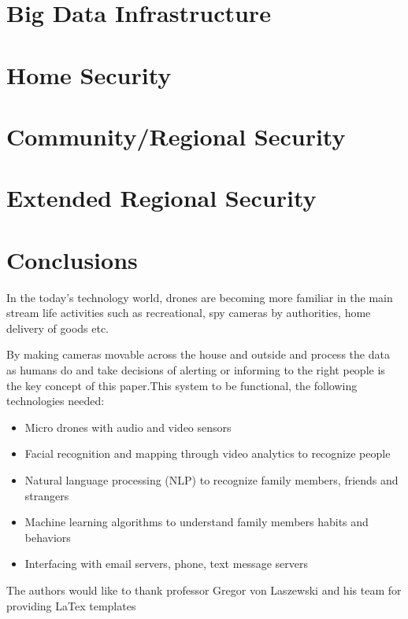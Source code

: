 \documentclass[sigconf]{acmart}
\begin{document}
\section{Big Data Infrastructure}

\section{Home Security}

\section{Community/Regional Security}

\section{Extended Regional Security}

\section{Conclusions}
In the today's technology world, drones are becoming more familiar in the main stream life activities such as recreational, spy cameras by authorities, home delivery of goods etc.

By making cameras movable across the house and outside and process the data as humans do and take decisions of alerting or informing to the right people is the key concept of this paper.This system to be functional, the following technologies needed:

\begin{itemize}
  
\item Micro drones with audio and video sensors

\item Facial recognition and mapping through video analytics to recognize people
	
\item Natural language processing (NLP) to recognize family members, friends and strangers

\item Machine learning algorithms to understand family members habits and behaviors

\item Interfacing with email servers, phone, text message servers

\end{itemize}

\begin{acks}
The authors would like to thank professor Gregor von Laszewski and his team for providing LaTex templates
\end{acks}


 
\end{document}
